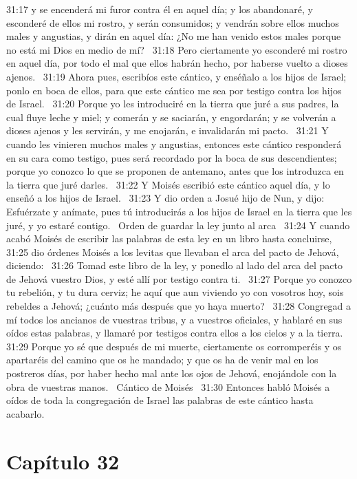 31:17 y se encenderá mi furor contra él en aquel día; y los abandonaré, y esconderé de ellos mi rostro, y serán consumidos; y vendrán sobre ellos muchos males y angustias, y dirán en aquel día: ¿No me han venido estos males porque no está mi Dios en medio de mí?  
31:18 Pero ciertamente yo esconderé mi rostro en aquel día, por todo el mal que ellos habrán hecho, por haberse vuelto a dioses ajenos.  
31:19 Ahora pues, escribíos este cántico, y enséñalo a los hijos de Israel; ponlo en boca de ellos, para que este cántico me sea por testigo contra los hijos de Israel.  
31:20 Porque yo les introduciré en la tierra que juré a sus padres, la cual fluye leche y miel; y comerán y se saciarán, y engordarán; y se volverán a dioses ajenos y les servirán, y me enojarán, e invalidarán mi pacto.  
31:21 Y cuando les vinieren muchos males y angustias, entonces este cántico responderá en su cara como testigo, pues será recordado por la boca de sus descendientes; porque yo conozco lo que se proponen de antemano, antes que los introduzca en la tierra que juré darles.  
31:22 Y Moisés escribió este cántico aquel día, y lo enseñó a los hijos de Israel.  
31:23 Y dio orden a Josué hijo de Nun, y dijo: Esfuérzate y anímate, pues tú introducirás a los hijos de Israel en la tierra que les juré, y yo estaré contigo.  
Orden de guardar la ley junto al arca  
31:24 Y cuando acabó Moisés de escribir las palabras de esta ley en un libro hasta concluirse,  
31:25 dio órdenes Moisés a los levitas que llevaban el arca del pacto de Jehová, diciendo:  
31:26 Tomad este libro de la ley, y ponedlo al lado del arca del pacto de Jehová vuestro Dios, y esté allí por testigo contra ti.  
31:27 Porque yo conozco tu rebelión, y tu dura cerviz; he aquí que aun viviendo yo con vosotros hoy, sois rebeldes a Jehová; ¿cuánto más después que yo haya muerto?  
31:28 Congregad a mí todos los ancianos de vuestras tribus, y a vuestros oficiales, y hablaré en sus oídos estas palabras, y llamaré por testigos contra ellos a los cielos y a la tierra.  
31:29 Porque yo sé que después de mi muerte, ciertamente os corromperéis y os apartaréis del camino que os he mandado; y que os ha de venir mal en los postreros días, por haber hecho mal ante los ojos de Jehová, enojándole con la obra de vuestras manos.  
Cántico de Moisés  
31:30 Entonces habló Moisés a oídos de toda la congregación de Israel las palabras de este cántico hasta acabarlo.  
\section*{Capítulo 32 }

